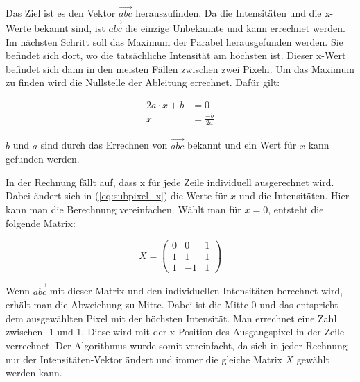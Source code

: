 	Das Ziel ist es den Vektor \( \vec{abc} \) herauszufinden. Da die Intensitäten und die x-Werte bekannt sind, ist \( \vec{abc} \) die einzige Unbekannte und kann errechnet werden. Im nächsten Schritt soll das Maximum der Parabel herausgefunden werden. Sie befindet sich dort, wo die tatsächliche Intensität am höchsten ist. Dieser x-Wert befindet sich dann in den meisten Fällen zwischen zwei Pixeln. Um das Maximum zu finden wird die Nullstelle der Ableitung errechnet. Dafür gilt:
	
	\begin{equation}
	\begin{aligned}
	2a \cdot x + b &= 0 \\
	x &= \frac{-b}{2a}
	\end{aligned}
	\end{equation}
	
	\( b \) und \( a \) sind durch das Errechnen von \( \vec{abc} \) bekannt und ein Wert für \( x \) kann gefunden werden.
	
	In der Rechnung fällt auf, dass x für jede Zeile individuell ausgerechnet wird. Dabei ändert sich in (\ref{eq:subpixel_x}) die Werte für \( x \) und die Intensitäten. Hier kann man die Berechnung vereinfachen. Wählt man für \( x = 0\), entsteht die folgende Matrix:
	
	\begin{equation}
	X = \begin{pmatrix}
	0 & 0 & 1 \\
	1 & 1 & 1 \\
	1 & -1 & 1
	\end{pmatrix}
	\end{equation}
	
	Wenn \( \vec{abc} \) mit dieser Matrix und den individuellen Intensitäten berechnet wird, erhält man die Abweichung zu Mitte. Dabei ist die Mitte 0 und das entspricht dem ausgewählten Pixel mit der höchsten Intensität. Man errechnet eine Zahl zwischen -1 und 1. Diese wird mit der x-Position des Ausgangspixel in der Zeile verrechnet. Der Algorithmus wurde somit vereinfacht, da sich in jeder Rechnung nur der Intensitäten-Vektor ändert und immer die gleiche Matrix \( X \) gewählt werden kann.
	
